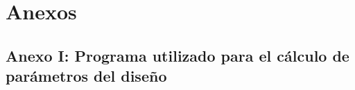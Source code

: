 \section{Anexos}

\subsection{Anexo I: Programa utilizado para el cálculo de parámetros del diseño}


